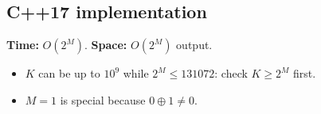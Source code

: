
\subsection*{C++17 implementation}

\begin{complexitybox}
\textbf{Time:} $O(2^M)$. \textbf{Space:} $O(2^M)$ output.
\end{complexitybox}

\begin{pitfallbox}
\begin{itemize}
  \item $K$ can be up to $10^9$ while $2^M\le131072$: check $K\ge2^M$ first.
  \item $M=1$ is special because $0\oplus1\ne0$.
\end{itemize}
\end{pitfallbox}
